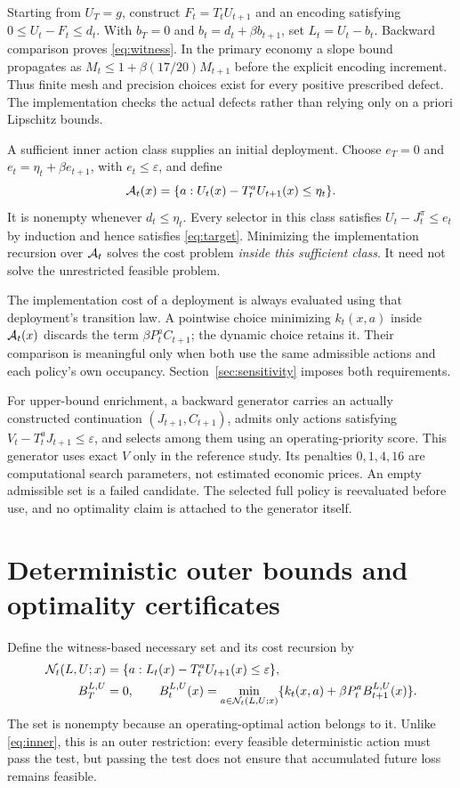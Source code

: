Starting from $U_T=g$, construct $F_t=T_tU_{t+1}$ and an encoding satisfying $0\leq U_t-F_t\leq d_t$. With $b_T=0$ and $b_t=d_t+\beta b_{t+1}$, set $L_t=U_t-b_t$. Backward comparison proves \eqref{eq:witness}. In the primary economy a slope bound propagates as $M_t\leq1+\beta(17/20)M_{t+1}$ before the explicit encoding increment. Thus finite mesh and precision choices exist for every positive prescribed defect. The implementation checks the actual defects rather than relying only on a priori Lipschitz bounds.

A sufficient inner action class supplies an initial deployment. Choose $e_T=0$ and $e_t=\eta_t+\beta e_{t+1}$, with $e_t\leq\varepsilon$, and define
\begin{equation}\label{eq:inner}
 \mathcal A_t(x)=\{a:U_t(x)-T_t^aU_{t+1}(x)\leq\eta_t\}.
\end{equation}
It is nonempty whenever $d_t\leq\eta_t$. Every selector in this class satisfies $U_t-J_t^\pi\leq e_t$ by induction and hence satisfies \eqref{eq:target}. Minimizing the implementation recursion over $\mathcal A_t$ solves the cost problem \emph{inside this sufficient class}. It need not solve the unrestricted feasible problem.

The implementation cost of a deployment is always evaluated using that deployment's transition law. A pointwise choice minimizing $k_t(x,a)$ inside $\mathcal A_t(x)$ discards the term $\beta P_t^a C_{t+1}$; the dynamic choice retains it. Their comparison is meaningful only when both use the same admissible actions and each policy's own occupancy. Section~\ref{sec:sensitivity} imposes both requirements.

For upper-bound enrichment, a backward generator carries an actually constructed continuation $(J_{t+1},C_{t+1})$, admits only actions satisfying $V_t-T_t^aJ_{t+1}\leq\varepsilon$, and selects among them using an operating-priority score. This generator uses exact $V$ only in the reference study. Its penalties $0,1,4,16$ are computational search parameters, not estimated economic prices. An empty admissible set is a failed candidate. The selected full policy is reevaluated before use, and no optimality claim is attached to the generator itself.

\section{Deterministic outer bounds and optimality certificates}\label{sec:outer}
Define the witness-based necessary set and its cost recursion by
\begin{align}
 \mathcal N_t(L,U;x)&=\{a:L_t(x)-T_t^aU_{t+1}(x)\leq\varepsilon\},\label{eq:necessary}\\
 B_T^{L,U}&=0,\qquad
 B_t^{L,U}(x)=\min_{a\in\mathcal N_t(L,U;x)}
 \{k_t(x,a)+\beta P_t^aB_{t+1}^{L,U}(x)\}.\label{eq:outer}
\end{align}
The set is nonempty because an operating-optimal action belongs to it. Unlike \eqref{eq:inner}, this is an outer restriction: every feasible deterministic action must pass the test, but passing the test does not ensure that accumulated future loss remains feasible.

